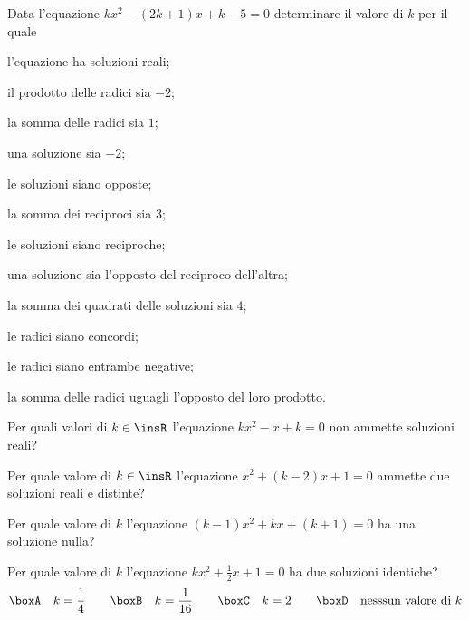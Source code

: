 \begin{esercizio}[\Ast]
 \label{ese:3.115}
Data l'equazione $kx^{2}-(2k + 1) x + k-5 = 0$ determinare il valore di $k$ per il quale
\begin{enumeratea}
\item l'equazione ha soluzioni reali;
\item il prodotto delle radici sia $-2$;
\item la somma delle radici sia $1$;
\item una soluzione sia $-2$;
\item le soluzioni siano opposte;
\item la somma dei reciproci sia $3$;
\item le soluzioni siano reciproche;
\item una soluzione sia l'opposto del reciproco dell'altra;
\item la somma dei quadrati delle soluzioni sia $4$;
\item le radici siano concordi;
\item le radici siano entrambe negative;
\item la somma delle radici uguagli l'opposto del loro prodotto.
\end{enumeratea}
\end{esercizio}

\begin{esercizio}
 \label{ese:3.116}
 Per quali valori di $k \in \insR$ l'equazione $kx^{2}-x + k = 0$ non ammette soluzioni reali?
\end{esercizio}

\begin{esercizio}
 \label{ese:3.117}
Per quale valore di $k \in \insR$ l'equazione $x^{2} + (k-2) x + 1 = 0$ ammette due soluzioni reali e distinte?
\end{esercizio}

\begin{esercizio}
 \label{ese:3.118}
Per quale valore di $k$ l'equazione $(k-1) x^{2} + kx + (k + 1) = 0$ ha una soluzione nulla?
\end{esercizio}

\begin{esercizio}
 \label{ese:3.119}
Per quale valore di $k$ l'equazione $kx^{2} + \frac{1}{2} x + 1 = 0$ ha due soluzioni identiche?
\[\boxA\quad k = \frac{1}{4}\qquad\boxB\quad k = \frac{1}{16}\qquad\boxC\quad k = 2\qquad\boxD\quad \text{nesssun valore di }k\]
\end{esercizio}


